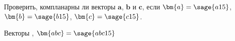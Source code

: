 \begin{question}
	Проверить, компланарны ли векторы $\bm a$, $\bm b$ и $\bm c$, если 
	$\bm{a}=\sage{a15}$, $\bm{b}=\sage{b15}$, $\bm{c}=\sage{c15}$.
\end{question}
\begin{solution}
	Векторы , \ensuremath{\bm{abc} = \sage{abc15}}
\end{solution}
\begin{comment}
\begin{question}
Даны векторы $\bm a$ и $\bm b$. 
\[\bm{a}=\sage{a1}, \bm{b}=\sage{b1}\] 
Найдите вектор $\bm c$, перпендикулярный векторам $\bm a$ и $\bm b$, если проекция вектора $\bm c$ на ось \textit{\sagestr{os}} равна $\sage{prc}$.
\end{question}	
\begin{solution}
$\bm c = \sage{s1[0]}$  
\end{solution}



\begin{question}
Вычислить площадь параллелограмма, построенного на векторах $\bm u$ и $\bm v$, если:
$\bm{u}=\sage{u}, \bm{v}=\sage{v}$, при этом о векторах $\bm a$ и $\bm b$ известно, что: 
$|\bm a|=\sage{normA}, |\bm b| = \sage{normB}$,
$\angle\left(\bm a, \bm b\right)=\sage{ang}^\circ$.
\end{question}
\begin{solution}
\ensuremath{\displaystyle{S = \sage{latex(Sparal)}}}
\end{solution}

\begin{question}
Вычислить угол между диагоналями параллелограмма, построенного на векторах $\bm u$ и $\bm v$, если:
$\bm{u}=\sage{u}, \bm{v}=\sage{v}$, при этом о векторах $\bm a$ и $\bm b$ известно, что: 
$|\bm a|=\sage{normA}, |\bm b| = \sage{normB}$,
$\angle\left(\bm a, \bm b\right)=\sage{ang}^\circ$.
\end{question}
\begin{solution}
\ensuremath{\displaystyle{\cos\angle\left(\bm{d_1}, \bm{d_2}\right)=\sage{angd1d2}}}
\end{solution}



\begin{question}
Вычислить объем тетраэдра с вершинами в точках $A_1, A_2, A_3, A_4$ и его высоту, опущенную из вершины $A_4$ на грань $A_1 A_2 A_3$:
\[A_1\sage{A1}, A_2\sage{A2}, A_3\sage{A3}, A_4\sage{A4}\]
\end{question}
\begin{solution}
Объем тетраэдра \ensuremath{\displaystyle{V = \sage{Vtetr}}}, длина высоты \ensuremath{\displaystyle{h = \sage{htetr}}}
\end{solution}
\end{comment}

